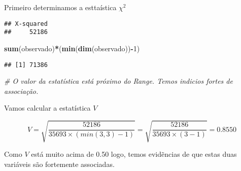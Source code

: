 \documentclass[11pt,]{style/krantz}
\makeatletter
\newenvironment{Shaded}{\begin{snugshade}}{\end{snugshade}}
\newcommand{\CommentTok}[1]{\textcolor[rgb]{0.56,0.35,0.01}{\textit{#1}}}
\newcommand{\DataTypeTok}[1]{\textcolor[rgb]{0.13,0.29,0.53}{#1}}
\newcommand{\DecValTok}[1]{\textcolor[rgb]{0.00,0.00,0.81}{#1}}
\newcommand{\KeywordTok}[1]{\textcolor[rgb]{0.13,0.29,0.53}{\textbf{#1}}}
\newcommand{\NormalTok}[1]{#1}
\newcommand{\OperatorTok}[1]{\textcolor[rgb]{0.81,0.36,0.00}{\textbf{#1}}}
\newcommand{\StringTok}[1]{\textcolor[rgb]{0.31,0.60,0.02}{#1}}
\newenvironment{kframe}{%
\medskip{}
\setlength{\fboxsep}{.8em}
 \def\at@end@of@kframe{}%
 \ifinner\ifhmode%
  \def\at@end@of@kframe{\end{minipage}}%
  \begin{minipage}{\columnwidth}%
 \fi\fi%
 \def\FrameCommand##1{\hskip\@totalleftmargin \hskip-\fboxsep
 \colorbox{shadecolor}{##1}\hskip-\fboxsep
     \hskip-\linewidth \hskip-\@totalleftmargin \hskip\columnwidth}%
 \MakeFramed {\advance\hsize-\width
   \@totalleftmargin\z@ \linewidth\hsize
   \@setminipage}}%
 {\par\unskip\endMakeFramed%
 \at@end@of@kframe}
\renewenvironment{Shaded}{\begin{kframe}}{\end{kframe}}
\theoremstyle{definition}
\theoremstyle{definition}
\theoremstyle{definition}
\theoremstyle{remark}
\let\BeginKnitrBlock\begin \let\EndKnitrBlock\end
\makeatother
\begin{document}
\BeginKnitrBlock{solution}
\iffalse{} {Solução. } \fi{}Primeiro determinamos a esttaística \(\chi^2\)
\EndKnitrBlock{solution}

\begin{Shaded}
\end{Shaded}

\begin{verbatim}
## X-squared 
##     52186
\end{verbatim}

\begin{Shaded}
\begin{Highlighting}[]
\KeywordTok{sum}\NormalTok{(observado)}\OperatorTok{*}\NormalTok{(}\KeywordTok{min}\NormalTok{(}\KeywordTok{dim}\NormalTok{(observado))}\OperatorTok{-}\DecValTok{1}\NormalTok{)}
\end{Highlighting}
\end{Shaded}

\begin{verbatim}
## [1] 71386
\end{verbatim}

\begin{Shaded}
\begin{Highlighting}[]
\CommentTok{# O valor da estatística está próximo do Range. Temos indicios fortes de associação.}
\end{Highlighting}
\end{Shaded}

Vamos calcular a estatística \(V\)

\[V = \sqrt{\frac{52186}{ 35693 \times (min(3,3)-1)}} = \sqrt{\frac{52186}{35693 \times (3-1)}} = 0.8550\]

Como \(V\) está muito acima de 0.50 logo, temos evidẽncias de que estas duas variáveis são fortemente associadas.
\end{document}

